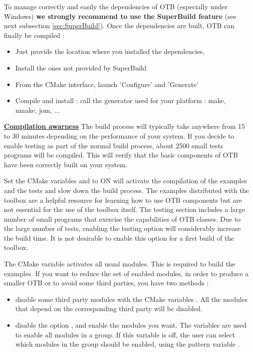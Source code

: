 To manage correctly and easily the dependencies of OTB (especially under Windows) \textbf{we strongly recommend to use the SuperBuild feature} (see next subsection \ref{sec:SuperBuild}).
Once the dependencies are built, OTB can finally be compiled : 
\begin{itemize}
	\item Just provide the location where you installed the dependencies, 
	\item Install the ones not provided by SuperBuild
    \item From the CMake interface, launch 'Configure' and 'Generate'
    \item Compile and install : call the generator used for your platform : make, nmake, jom, ... 
\end{itemize}

\textbf{\underline{Compilation awarness}}
The build process will typically take anywhere from 15 to 30 minutes depending on the performance of your system. If you decide to enable testing as part of the normal build process, about 2500 small tests programs will be compiled. This will verify that the basic components of OTB have been correctly built on your system.

Set the CMake variables  and  to ON will activate the compilation of the examples and the tests and slow down the build process. The examples distributed with the toolbox are a helpful resource for learning how to use OTB components but are not essential for the use of the toolbox itself. The testing section includes a large number of small programs that exercise the capabilities of OTB classes. Due to the large number of tests, enabling the testing option will considerably increase the build time.  It is not desirable to enable this option for a first build of the toolbox.

The CMake variable  activates all usual modules. This is required to build the examples. If you want to reduce the set of enabled modules, in order to produce a smaller OTB or to avoid some third parties, you have two methods :
\begin{itemize}
  \item disable some third party modules with the CMake variables . All the modules that depend on the corresponding third party will be disabled.
  \item disable the option , and enable the modules you want. The variables  are used to enable all modules in a group. If this variable is off, the user can select which modules in the group should be enabled, using the pattern variable .
\end{itemize}


